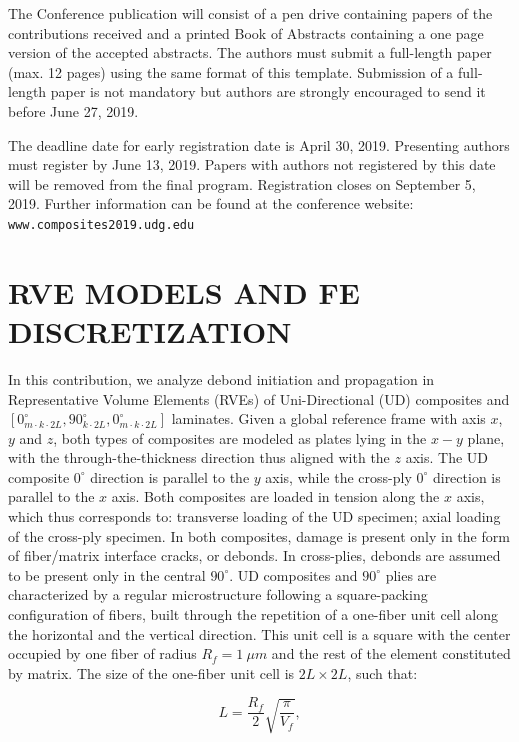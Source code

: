 \documentclass[12pt,a4paper]{article}
\begin{document}
The Conference publication will consist of a pen drive containing papers of the contributions received and a printed Book of Abstracts containing a one page version of the accepted abstracts. The authors must submit a full-length paper (max. 12 pages) using the same format of this template. Submission of a full-length paper is not mandatory but authors are strongly encouraged to send it before June 27, 2019.

The deadline date for early registration date is April 30, 2019. Presenting authors must register by June 13, 2019. Papers with authors not registered by this date will be removed from the final program.
Registration closes on September 5, 2019. Further information can be found at the conference website: \texttt{www.composites2019.udg.edu}

\section{RVE MODELS AND FE DISCRETIZATION}

In this contribution, we analyze debond initiation and propagation in Representative Volume Elements (RVEs) of Uni-Directional (UD) composites and $\left[0_{m\cdot k\cdot2L}^{\circ},90_{k\cdot2L}^{\circ},0_{m\cdot k\cdot2L}^{\circ}\right]$ laminates. Given a global reference frame with axis $x$, $y$ and $z$, both types of composites are modeled as plates lying in the $x-y$ plane, with the through-the-thickness direction thus aligned with the $z$ axis. The UD composite $0^{\circ}$ direction is parallel to the $y$ axis, while the cross-ply $0^{\circ}$ direction is parallel to the $x$ axis. Both composites are loaded in tension along the $x$ axis, which thus corresponds to: transverse loading of the UD specimen; axial loading of the cross-ply specimen. In both composites, damage is present only in the form of fiber/matrix interface cracks, or debonds. In cross-plies, debonds are assumed to be present only in the central ${90^{\circ}}$. UD composites and $90^{\circ}$ plies are characterized by a regular microstructure following a square-packing configuration of fibers, built through the repetition of a one-fiber unit cell along the horizontal and the vertical direction. This unit cell is a square with the center occupied by one fiber of radius $R_{f}=1\ \mu m$ and the rest of the element constituted by matrix. The size of the one-fiber unit cell is $2L\times 2L$, such that:

\begin{equation}\label{eq:LVf}
L=\frac{R_{f}}{2}\sqrt{\frac{\pi}{V_{f}}},
\end{equation}
\end{document}
